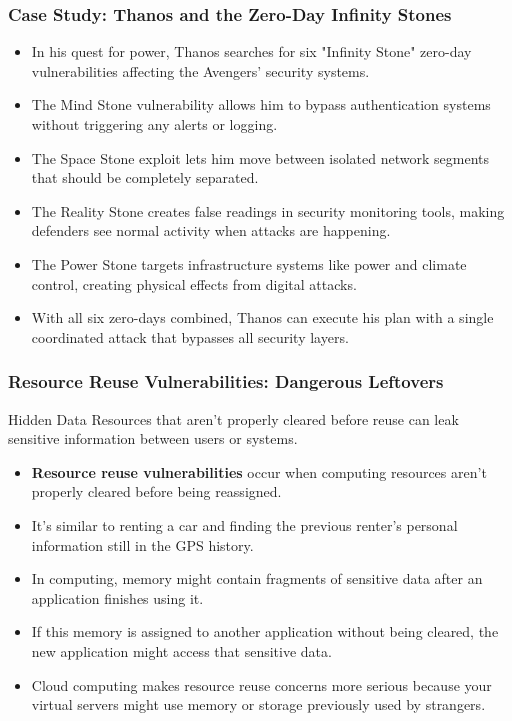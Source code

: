 \documentclass{beamer}
\begin{document}
\begin{frame}
    \frametitle{Case Study: Thanos and the Zero-Day Infinity Stones}
    
    \begin{itemize}
        \item In his quest for power, Thanos searches for six "Infinity Stone" zero-day vulnerabilities affecting the Avengers' security systems.
        \item The Mind Stone vulnerability allows him to bypass authentication systems without triggering any alerts or logging.
        \item The Space Stone exploit lets him move between isolated network segments that should be completely separated.
        \item The Reality Stone creates false readings in security monitoring tools, making defenders see normal activity when attacks are happening.
        \item The Power Stone targets infrastructure systems like power and climate control, creating physical effects from digital attacks.
        \item With all six zero-days combined, Thanos can execute his plan with a single coordinated attack that bypasses all security layers.
    \end{itemize}
\end{frame}

\begin{frame}
    \frametitle{Resource Reuse Vulnerabilities: Dangerous Leftovers}
    
    \begin{alertblock}{Hidden Data}
        Resources that aren't properly cleared before reuse can leak sensitive information between users or systems.
    \end{alertblock}
    
    \begin{itemize}
        \item \textbf{Resource reuse vulnerabilities} occur when computing resources aren't properly cleared before being reassigned.
        \item It's similar to renting a car and finding the previous renter's personal information still in the GPS history.
        \item In computing, memory might contain fragments of sensitive data after an application finishes using it.
        \item If this memory is assigned to another application without being cleared, the new application might access that sensitive data.
        \item Cloud computing makes resource reuse concerns more serious because your virtual servers might use memory or storage previously used by strangers.
    \end{itemize}
\end{frame}
\end{document}
